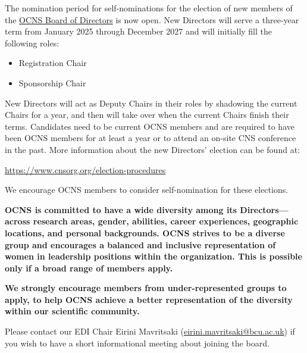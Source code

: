 \documentclass[11pt,a4paper,oneside]{article}
\begin{document}
The nomination period for self-nominations for the election of new members of the \href{https://www.cnsorg.org/board-of-directors}{OCNS Board of Directors} is now open.
New Directors will serve a three-year term from January 2025 through December 2027 and will initially fill the following roles:
\begin{multicols}{2}
  \begin{itemize}
    \item Registration Chair
    \item Sponsorship Chair
  \end{itemize}
\end{multicols}

New Directors will act as Deputy Chairs in their roles by shadowing the current Chairs for a year, and then will take over when the current Chairs finish their terms.
Candidates need to be current OCNS members and are required to have been OCNS members for at least a year or to attend an on-site CNS conference in the past.
More information about the new Directors' election can be found at:

\begin{center}
\url{https://www.cnsorg.org/election-procedures}
\end{center}


We encourage OCNS members to consider self-nomination for these elections.

\begin{tcolorbox}[colback=lighterOrange, colframe=black, width=\textwidth, boxrule=0.1mm]
\textbf{OCNS is committed to have a wide diversity among its Directors---across research areas, gender, abilities, career experiences, geographic locations, and personal backgrounds.
OCNS strives to be a diverse group and encourages a balanced and inclusive representation of women in leadership positions within the organization.
This is possible only if a broad range of members apply.}\\\vspace{1ex}

\textbf{We strongly encourage members from under-represented groups to apply, to help OCNS achieve a better representation of the diversity within our scientific community.}
\end{tcolorbox}

Please contact our EDI Chair Eirini Mavritsaki (\href{mailto:eirini.mavritsaki@bcu.ac.uk}{eirini.mavritsaki@bcu.ac.uk}) if you wish to have a short informational meeting about joining the board.
\end{document}
